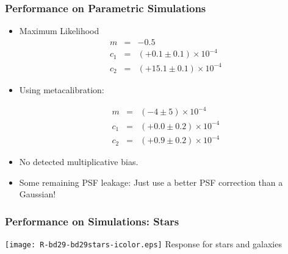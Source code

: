 \documentclass{beamer}
\newcommand{\mcal}{metacalibration}
\begin{document}
\frame
{
    \frametitle{Performance on Parametric Simulations}

 
    \begin{itemize}


        \item Maximum Likelihood 
            {\color{brightred} 
                \begin{eqnarray}
                    m & = & -0.5  \nonumber \\
                  c_1 & = & (+0.1 \pm 0.1) \times 10^{-4} \nonumber \\
                  c_2 & = & (+15.1 \pm 0.1) \times 10^{-4} \nonumber
                \end{eqnarray}
            }


        \item Using \mcal:

            {\color{gold} 
                \begin{eqnarray}
                    m & = & (-4 \pm 5) \times 10^{-4} \nonumber \\
                  c_1 & = & (+0.0 \pm 0.2) \times 10^{-4} \nonumber \\
                  c_2 & = & (+0.9 \pm 0.2) \times 10^{-4} \nonumber
                \end{eqnarray}
            }


        \item No detected multiplicative bias.
        \item Some remaining PSF leakage: Just use
            a better PSF correction than a Gaussian!

    \end{itemize}

}


\frame
{
    \frametitle{Performance on Simulations: Stars}
 
    \begin{center}
        \texttt{[image: R-bd29-bd29stars-icolor.eps]}
        \newline
        {\large Response for stars and galaxies}
    \end{center}

}
\end{document}
